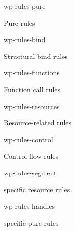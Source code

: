 \documentclass{standalone}
\begin{document}
\footnotesize

\begin{figure}[ht]
{wp-rules-pure}
\label{fig:wp-rules-pure}
\caption{Pure rules}
\end{figure}

\begin{figure}
{wp-rules-bind}
\label{fig:wp-rules-bind}
\caption{Structural bind rules}
\end{figure}

\begin{figure}
{wp-rules-functions}
\label{fig:wp-rules-functions}
\caption{Function call rules}
\end{figure}

\begin{figure}
{wp-rules-resources}
\label{fig:wp-rules-resources}
\caption{Resource-related rules}
\end{figure}



\begin{figure}
{wp-rules-control}
\label{fig:wp-rules-control}
\caption{Control flow rules}
\end{figure}

\begin{figure}
  {wp-rules-segment}
  \label{fig:wp-rules-segment}
  \caption{\irismswasm specific resource rules}
\end{figure}

\begin{figure}
  {wp-rules-handles}
  \label{fig:wp-rules-handles}
  \caption{\irismswasm specific pure rules}
\end{figure}

 
\end{document}
